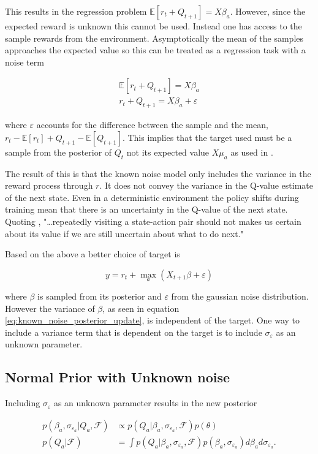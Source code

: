 This results in the regression problem $\mathbb{E}[r_t + Q_{t+1}] = X\beta_a$. However, since the expected reward is unknown this cannot be used. Instead one has access to the sample rewards from the environment. Asymptotically the mean of the samples approaches the expected value so this can be treated as a regression task with a noise term

\begin{align*}
    \mathbb{E}[r_t + Q_{t+1}] = X\beta_a \\
    r_t + Q_{t+1} = X\beta_a + \varepsilon
\end{align*}

where $\varepsilon$ accounts for the difference between the sample and the mean, $r_t - \mathbb{E}[r_t] + Q_{t+1} - \mathbb{E}[Q_{t+1}]$. This implies that the target used must be a sample from the posterior of $Q_t$ not its expected value $X\mu_a$ as used in \cite{azziz_2018}. 

The result of this is that the known noise model only includes the variance in the reward process through $r$. It does not convey the variance in the Q-value estimate of the next state. Even in a deterministic environment the policy shifts during training mean that there is an uncertainty in the Q-value of the next state. Quoting \cite{moerland_2017},  "\dots repeatedly visiting a state-action pair should not makes us certain about its value if we are still uncertain about what to do next."

Based on the above a better choice of target is

$$
y = r_t + \max_a (X_{t+1}\beta + \varepsilon)
$$

where $\beta$ is sampled from its posterior and $\varepsilon$ from the gaussian noise distribution. However the variance of $\beta$, as seen in equation \ref{eq:known_noise_posterior_update}, is independent of the target. One way to include a variance term that is dependent on the target is to include $\sigma_{\varepsilon}$ as an unknown parameter.

\subsection{Normal Prior with Unknown noise}

Including $\sigma_{\varepsilon}$ as an unknown parameter results in the new posterior 

\begin{align*}
    p(\beta_a, \sigma_{\varepsilon_a}|Q_a, \mathcal{F}) &\propto p(Q_a| \beta_a, \sigma_{\varepsilon_a}, \mathcal{F})p(\theta) \\
    p(Q_a|\mathcal{F}) &= \int p(Q_a|\beta_a, \sigma_{\varepsilon_a}, \mathcal{F}) p(\beta_a, \sigma_{\varepsilon_a})d\beta_a d\sigma_{\varepsilon_a}.
\end{align*}

